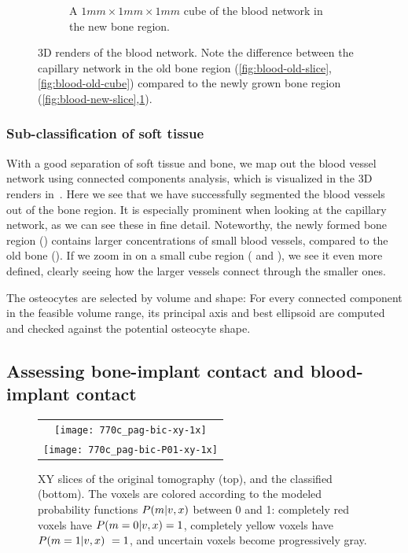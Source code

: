 \begin{figure}
\begin{subfigure}[b]{.48\linewidth}
        \caption{A $1mm \times 1 mm \times 1 mm$ cube of the blood network in the new bone region.}
        \label{fig:blood-new-cube}
    \end{subfigure}
    \caption{
        3D renders of the blood network. Note the difference between the
        capillary network in the old bone region
        (\ref{fig:blood-old-slice},\ref{fig:blood-old-cube}) compared to the
        newly grown bone region
        (\ref{fig:blood-new-slice},\ref{fig:blood-new-cube}).
    }
    \label{fig:blood-network}
\end{figure}

\subsubsection{Sub-classification of soft tissue}

With a good separation of soft tissue and bone, we map out the blood vessel
network using connected components analysis, which is visualized in the 3D
renders in~. Here we see that we have successfully
segmented the blood vessels out of the bone region. It is especially prominent
when looking at the capillary network, as we can see these in fine detail.
Noteworthy, the newly formed bone region () contains
larger concentrations of small blood vessels, compared to the old bone
(). If we zoom in on a small cube region
( and ), we see it even more
defined, clearly seeing how the larger vessels connect through the smaller
ones.

The osteocytes are selected by volume and shape: For every connected component
in the feasible volume range, its principal axis and best ellipsoid are computed
and checked against the potential osteocyte shape.

\subsection{Assessing bone-implant contact and blood-implant contact}

\begin{figure}
  \centering
  \begin{tabular}{c}
    \texttt{[image: 770c\_pag-bic-xy-1x]} \\
    \texttt{[image: 770c\_pag-bic-P01-xy-1x]}
  \end{tabular}
  \caption{
    XY slices of the original tomography (top), and the classified (bottom).
    The voxels are colored according to the modeled probability functions
    $P(m\vert v,x)$ between 0 and 1: completely red voxels have $P(m=0\vert
    v,x) = 1$, completely yellow voxels have $P(m=1\vert v,x)\ = 1$,
    and uncertain voxels become progressively gray.
  }
  \label{fig:histology-comparison1}
\end{figure}

